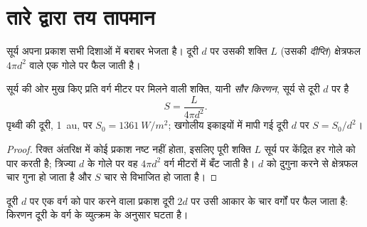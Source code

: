 \section{तारे द्वारा तय तापमान}

सूर्य अपना प्रकाश सभी दिशाओं में बराबर भेजता है। दूरी $d$ पर उसकी
शक्ति $L$ (उसकी \emph{दीप्ति}) क्षेत्रफल $4\pi d^2$ वाले एक गोले पर फैल जाती है।

\begin{proposition}[सूर्य के प्रकाश का व्युत्क्रम वर्ग नियम]\label{prop:g10:habitable-planet:inverse-square}
सूर्य की ओर मुख किए प्रति वर्ग मीटर पर मिलने वाली शक्ति, यानी \emph{सौर
किरणन}, सूर्य से दूरी $d$ पर है
\[
  S = \frac{L}{4\pi d^2}.
\]
पृथ्वी की दूरी, \qty{1}{au}, पर $S_0 = \qty{1361}{W/m^2}$; खगोलीय इकाइयों में मापी
गई दूरी $d$ पर $S = S_0/d^2$।
\end{proposition}

\begin{proof}
रिक्त अंतरिक्ष में कोई प्रकाश नष्ट नहीं होता, इसलिए पूरी शक्ति $L$ सूर्य पर केंद्रित हर गोले
को पार करती है; त्रिज्या $d$ के गोले पर वह $4\pi d^2$
वर्ग मीटरों में बँट जाती है। $d$ को दुगुना करने से क्षेत्रफल चार गुना हो जाता है और $S$
चार से विभाजित हो जाता है।
\end{proof}

\begin{omfigure}

{\small दूरी $d$ पर एक वर्ग को पार करने वाला प्रकाश दूरी $2d$ पर उसी आकार के चार
वर्गों पर फैल जाता है: किरणन दूरी के वर्ग के व्युत्क्रम के अनुसार घटता है।}
\end{omfigure}

